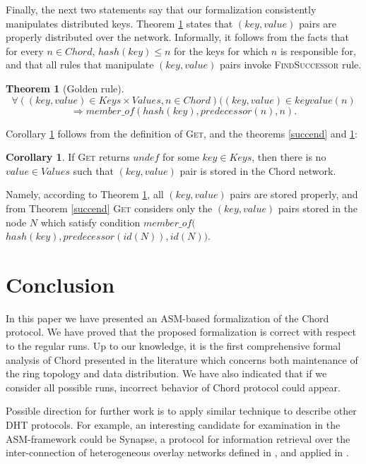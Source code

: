 \documentclass{amsart}
\theoremstyle{definition}
\newtheorem{theorem}{Theorem}[section]
\newtheorem{corollary}{Corollary}[section]
\begin{document}
Finally, the next two statements say that our formalization
consistently manipulates distributed keys. Theorem
\ref{golden_rule} states that $(key, value)$ pairs are properly
distributed over the network. Informally, it follows from the
facts that for every $n \in Chord$, $hash(key) \leqslant n$ for
the keys for which $n$ is responsible for, and that all rules that
manipulate $(key, value)$ pairs invoke \textsc{FindSuccessor}
rule.

\begin{theorem}[Golden rule]\label{golden_rule}
$$
\forall((key, value) \in Keys \times Values, n \in Chord) ((key, value) \in keyvalue(n)
$$
$$
\Rightarrow member\_of(hash(key), predecessor(n),n).
$$
\end{theorem}

Corollary \ref{corol1} follows from the definition of
\textsc{Get}, and the theorems \ref{succend} and
\ref{golden_rule}:

\begin{corollary} \label{corol1}
If \textsc{Get} returns $undef$ for some $key \! \in \! Keys$, then there is no $value \! \in \! Values$ such that $(key, value)$ pair is
stored in the Chord network.
\end{corollary}
Namely, according to Theorem \ref{golden_rule}, all $(key, value)$
pairs are stored properly, and from Theorem \ref{succend}
\textsc{Get} considers only the $(key, value)$ pairs stored in the node $N$ which
satisfy condition $member\_of($ $hash(key), predecessor(id(N)),id(N))$.





\section{Conclusion}

\label{conclusion}

In this paper we have presented an ASM-based formalization of the Chord protocol. We have proved that the proposed formalization is
correct with respect to the regular runs. Up to our knowledge, it is the first comprehensive formal analysis of Chord presented in the
literature which concerns both maintenance of the ring topology and data distribution. We have also indicated that if we consider all
possible runs, incorrect behavior of Chord protocol could appear.

Possible direction for further work is to apply similar technique to describe other DHT protocols. For example, an interesting
candidate for examination in the ASM-framework could be Synapse, a protocol for information retrieval over the inter-connection of
heterogeneous overlay networks defined in \cite{LTVBCM10}, and applied in \cite{ohrid}.
\end{document}
